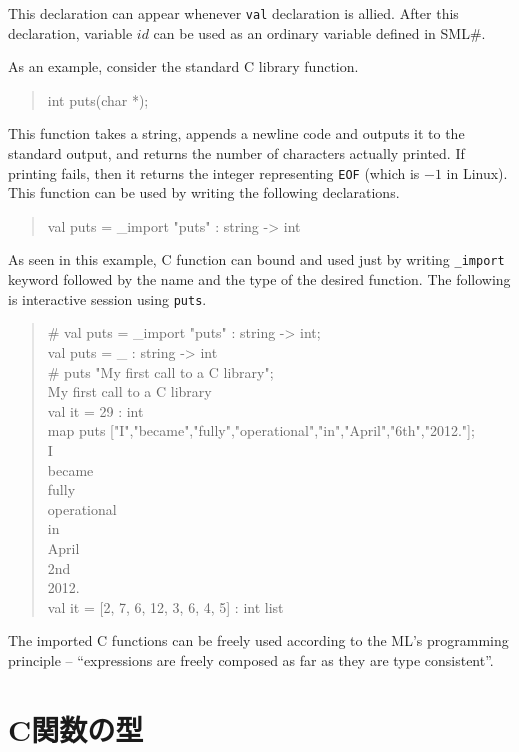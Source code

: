 \documentclass{jbook}
\newcommand{\txt}[2]{#1}
\newcommand{\smlsharp}{SML\#}
\newenvironment{program}{\begin{quote}\begin{tt}}%
                        {\end{tt}\end{quote}}
\begin{document}
	This declaration can appear whenever {\tt val} declaration is
allied.
	After this declaration, variable $\mathit{id}$ can be used as an ordinary
variable defined in \smlsharp{}.

	As an example, consider the standard C library function.
\begin{program}
int puts(char *);
\end{program}
	This function takes a string, appends a newline code and outputs
it to the standard output, and returns the number of characters actually
printed.
	If printing fails, then it returns the integer representing
{\tt EOF} (which is $-1$ in Linux).
	This function can be used by writing the following declarations.
\begin{program}
val puts = \_import "puts" : string -> int
\end{program}
	As seen in this example, C function can bound and used just by
writing {\tt \_import} keyword followed by the name and the type of the
desired function.
	The following is interactive session using {\tt puts}.
\begin{program}
\# val puts = \_import "puts" : string -> int;\\
val puts = \_ : string -> int\\
\# puts "My first call to a C library";\\
My first call to a C library\\
val it = 29 : int\\
map puts  ["I","became","fully","operational","in","April","6th","2012."];\\
I\\
became\\
fully\\
operational\\
in\\
April\\
2nd\\
2012.\\
val it = [2, 7, 6, 12, 3, 6, 4, 5] : int list
\end{program}
	The imported C functions can be freely used according to the
ML's programming principle -- ``expressions are freely
composed as far as they are type consistent''.
\fi%

\section{\txt{C関数の型}{Declaring types of C functions}}
\label{sec:extensionCtype}
\end{document}
